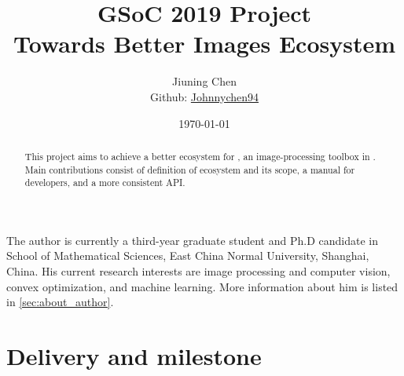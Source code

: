 \documentclass[12pt, a4paper]{article}
\title{GSoC 2019 Project\\Towards Better Images Ecosystem}
\author{Jiuning Chen\mailto{johnnychen94@hotmail.com}\\
Github: \href{https://github.com/johnnychen94}{Johnnychen94}}
\date{\today}
\begin{document}
\maketitle

\renewcommand\abstractname{Abstract}
\begin{abstract}
    This project aims to achieve a better ecosystem for \href{https://juliaimages.org/latest/}{\images}, an image-processing toolbox in \href{https://julialang.org/}{\langjulia}. Main contributions consist of definition of \images ecosystem and its scope, a manual for developers, and a more consistent API.
\end{abstract}

\noindent The author is currently a third-year graduate student and Ph.D candidate in School of Mathematical Sciences, East China Normal University, Shanghai, China. His current research interests are image processing and computer vision, convex optimization, and machine learning. More information about him is listed in \cref{sec:about_author}.\par



\section{Delivery and milestone}


\end{document}
